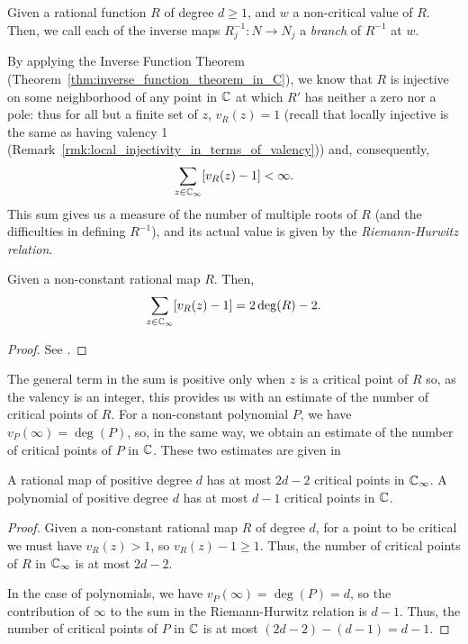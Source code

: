 \begin{definition}
    Given a rational function $R$ of degree $d \geq 1$, and $w$ a non-critical
    value of $R$. Then, we call each of the inverse maps $R_j^{-1} : N \to N_j$
    a \emph{branch} of $R^{-1}$ at $w$.
\end{definition}

By applying the Inverse Function Theorem
(Theorem~\ref{thm:inverse_function_theorem_in_C}), we know that $R$ is injective
on some neighborhood of any point in $\mathbb{C}$ at which $R'$ has neither a zero nor a
pole: thus for all but a finite set of $z$, $v_R(z) = 1$ (recall that locally
injective is the same as having valency 1
(Remark~\ref{rmk:local_injectivity_in_terms_of_valency})) and, consequently,
\begin{equation*}
    \sum_{z \in \mathbb{C}_\infty} [v_R(z) - 1] < \infty.
\end{equation*}
This sum gives us a measure of the number of multiple roots of $R$ (and the
difficulties in defining $R^{-1}$), and its actual value is given by the
\emph{Riemann-Hurwitz relation}.

\begin{theorem}
    \label{thm:Riemann_Hurwitz_relation}
    Given a non-constant rational map $R$. Then,
    \begin{equation*}
        \sum_{z \in \mathbb{C}_\infty} [v_R(z) - 1] = 2\deg(R) - 2.
    \end{equation*}
\end{theorem}
\begin{proof}
    See \cite[44]{Beardon1991}.
\end{proof}

The general term in the sum is positive only when $z$ is a critical point of $R$
so, as the valency is an integer, this provides us with an estimate of the
number of critical points of $R$. For a non-constant polynomial $P$, we have
$v_P(\infty) = \deg(P)$, so, in the same way, we obtain an estimate of the
number of critical points of $P$ in $\mathbb{C}$. These two estimates are given in

\begin{corollary}
    A rational map of positive degree $d$ has at most $2d - 2$ critical points
    in $\mathbb{C}_\infty$. A polynomial of positive degree $d$ has at most $d - 1$ critical
    points in $\mathbb{C}$.
\end{corollary}
\begin{proof}
    Given a non-constant rational map $R$ of degree $d$, for a point to be
    critical we must have $v_R(z) > 1$, so $v_R(z) - 1 \geq 1$. Thus, the number
    of critical points of $R$ in $\mathbb{C}_\infty$ is at most $2d - 2$.

    In the case of polynomials, we have $v_P(\infty) = \deg(P) = d$, so the
    contribution of $\infty$ to the sum in the Riemann-Hurwitz relation is $d -
    1$. Thus, the number of critical points of $P$ in $\mathbb{C}$ is at most $(2d - 2)
    - (d - 1) = d - 1$.
\end{proof}

